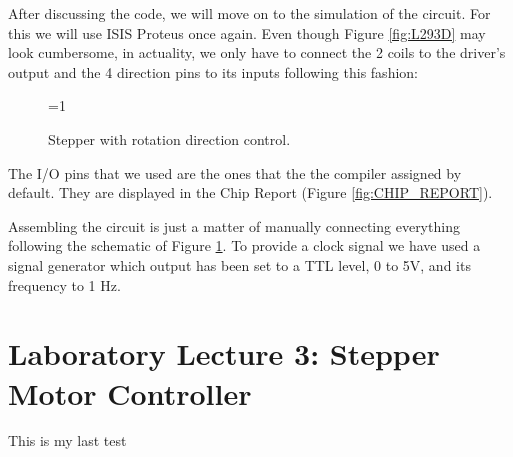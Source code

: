 \documentclass[a4paper, 11pt, oneside]{article}
\begin{document}
After discussing the code, we will move on to the simulation of the circuit. For this we will use ISIS Proteus once again. Even though Figure \ref{fig:L293D} may look cumbersome, in actuality, we only have to connect the 2 coils to the driver's output and the 4 direction pins to its inputs following this fashion:\medskip

\begin{figure}[H]
    \centering
    
    \ifnum\value{ANIMATION}=1 {
    } 
    \fi
    
    \caption{Stepper with rotation direction control.}
    \label{fig:STEPPER_ROTATION}
\end{figure}

The I/O pins that we used are the ones that the the compiler assigned by default. They are displayed in the Chip Report (Figure \ref{fig:CHIP_REPORT}).\medskip

Assembling the circuit is just a matter of manually connecting everything following the schematic of Figure \ref{fig:STEPPER_ROTATION}. To provide a clock signal we have used a signal generator which output has been set to a TTL level, 0 to 5V, and its frequency to 1 Hz.  

\clearpage

\section{Laboratory Lecture 3: Stepper Motor Controller}

This is my last test



\clearpage
\printbibliography
\end{document}
